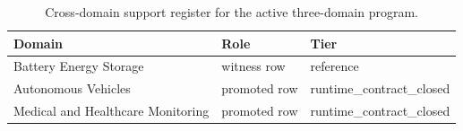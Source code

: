 \begin{table}[htbp]
\centering
\caption{Cross-domain support register for the active three-domain program.}
\label{tbl:ch40-44-cross-domain-support}
\begin{tabular}{lll}
\toprule
Domain & Role & Tier\\
\midrule
Battery Energy Storage & witness row & reference\\
Autonomous Vehicles & promoted row & runtime\_contract\_closed\\
Medical and Healthcare Monitoring & promoted row & runtime\_contract\_closed\\
\bottomrule
\end{tabular}
\end{table}
